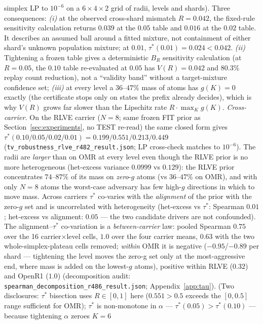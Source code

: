 \documentclass{article}
\theoremstyle{definition}
\theoremstyle{remark}
\begin{document}
simplex LP to $10^{-6}$ on a $6\times4\times2$ grid of radii, levels and
shards). Three consequences: \emph{(i)} at the observed cross-shard mismatch
$R=0.042$, the fixed-rule sensitivity calculation returns $0.039$ at the
$0.05$ table and $0.016$ at the $0.02$ table. It describes an assumed ball
around a fitted mixture, not containment of either shard's unknown population
mixture; at $0.01$, $\tau^*(0.01)=0.024<0.042$. \emph{(ii)} Tightening a frozen
table gives a deterministic $B_R$ sensitivity calculation (at $R=0.05$, the
$0.10$ table re-evaluated at $0.05$ has $V(R)=0.042$ and $80.3\%$ replay count
reduction), not a ``validity band'' without a target-mixture confidence set;
\emph{(iii)} at every level a $36$--$47\%$ mass of atoms has
$g(K)=0$ exactly (the certificate stops only on states the prefix already
decides), which is why $V(R)$ grows far slower than the Lipschitz rate
$R\cdot\max_K g(K)$.
\emph{Cross-carrier.} On the RLVE carrier ($N{=}8$; same frozen FIT prior as
Section~\ref{sec:experiments}, no TEST re-read) the same closed form gives
$\tau^*(0.10/0.05/0.02/0.01)=0.199/0.551/0.213/0.449$
(\texttt{tv\_robustness\_rlve\_r482\_result.json}; LP cross-check matches to
$10^{-6}$). The radii are \emph{larger} than on OMR at every level even
though the RLVE prior is no more heterogeneous (het-excess variance
$0.0999$ vs $0.129$): the RLVE prior concentrates $74$--$87\%$ of its mass
on \emph{zero}-$g$ atoms (vs $36$--$47\%$ on OMR), and with only $N{=}8$
atoms the worst-case adversary has few high-$g$ directions in which to
move mass. Across carriers $\tau^*$ co-varies with the \emph{alignment} of
the prior with the zero-$g$ set and is uncorrelated with heterogeneity
(het-excess vs $\tau^*$: Spearman $0.01$; het-excess vs alignment: $0.05$
--- the two candidate drivers are not confounded). The
alignment--$\tau^*$ co-variation is a \emph{between-carrier} law: pooled
Spearman $0.75$ over the 16 carrier$\times$level cells, $1.0$ over the
four carrier means, $0.63$ with the two whole-simplex-plateau cells
removed; \emph{within} OMR it is negative ($-0.95$/$-0.89$ per shard ---
tightening the level moves the zero-g set only at the most-aggressive
end, where mass is added on the lowest-$g$ atoms), positive within RLVE
($0.32$) and OpenR1 ($1.0$) (decomposition audit:
\texttt{spearman\_decomposition\_r486\_result.json};
Appendix~\ref{app:tau}). (Two disclosures: $\tau^*$
bisection uses $R\in[0,1]$ here ($0.551>0.5$ exceeds the $[0,0.5]$ range
sufficient for OMR); $\tau^*$ is non-monotone in $\alpha$ ---
$\tau^*(0.05)>\tau^*(0.10)$ --- because tightening $\alpha$ zeroes $K{=}6$
\end{document}
